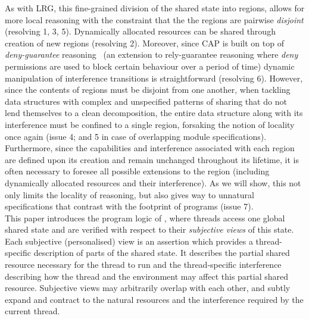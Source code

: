 As with LRG, this fine-grained division of the shared state into regions, allows for more local reasoning with the constraint that the the regions are pairwise \emph{disjoint} (resolving 1, 3, 5). Dynamically allocated resources can be shared through creation of new regions (resolving 2). Moreover, since CAP is built on top of \emph{deny-guarantee} reasoning~\cite{dg} (an extension to rely-guarantee reasoning where \emph{deny} permissions are used to block certain behaviour over a period of time) dynamic manipulation of interference transitions is straightforward (resolving 6). However, since the contents of regions must be disjoint from one another, when tackling data structures with complex and unspecified patterns of sharing that do not lend themselves to a clean decomposition, the entire data structure along with its interference must be confined to a single region, forsaking the notion of locality once again (issue 4; and 5 in case of overlapping module specifications). Furthermore, since the capabilities and interference associated with each region are defined upon its creation and remain unchanged throughout its lifetime, it is often necessary to foresee all possible extensions to the region (including dynamically allocated resources and their interference). As we will show, this not only limits the locality of reasoning, but also gives way to unnatural specifications that contrast with the footprint of programs (issue 7).\\
%
%
%
\indent This paper introduces the program logic of \colosl, where threads access one global shared state and are verified with respect to their \emph{subjective views} of this state. Each subjective (personalised) view  is an assertion which provides a thread-specific description of parts of the shared state. It describes the partial shared resource necessary for the thread to run and the thread-specific interference describing how the thread and the environment may affect this partial shared resource. Subjective views may arbitrarily overlap with each other, and subtly expand and contract to the natural resources and the interference required by  the current thread. 
